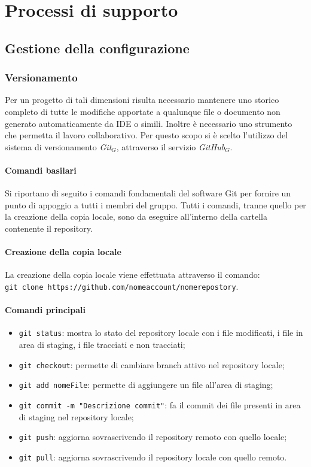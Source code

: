 \chapter{Processi di supporto}\label{PdS}
\section{Gestione della configurazione}
\subsection{Versionamento}
Per un progetto di tali dimensioni risulta necessario mantenere uno storico completo di tutte le modifiche apportate a qualunque file o documento non generato automaticamente da IDE o simili. Inoltre è necessario uno strumento che permetta il lavoro collaborativo. Per questo scopo si è scelto l'utilizzo del sistema di versionamento \textit{Git$_{G}$}, attraverso il servizio \textit{GitHub$_{G}$}.
\subsubsection{Comandi basilari}
Si riportano di seguito i comandi fondamentali del software Git per fornire un punto di appoggio a tutti i membri del gruppo. Tutti i comandi, tranne quello per la creazione della copia locale, sono da eseguire all'interno della cartella contenente il repository.
\subsubsection{Creazione della copia locale}
La creazione della copia locale viene effettuata attraverso il comando:\\
\texttt{git clone https://github.com/nomeaccount/nomerepostory}.
\subsubsection{Comandi principali}
\begin{itemize}
	\item \texttt{git status}: mostra lo stato del repository locale con i file modificati, i file in area di staging, i file tracciati e non tracciati;
	\item \texttt{git checkout}: permette di cambiare branch attivo nel repository locale;
	\item \texttt{git add nomeFile}: permette di aggiungere un file all'area di staging;
	\item \texttt{git commit -m "Descrizione commit"}: fa il commit dei file presenti in area di staging nel repository locale;
	\item \texttt{git push}: aggiorna sovrascrivendo il repository remoto con quello locale;
	\item \texttt{git pull}: aggiorna sovrascrivendo il repository locale con quello remoto.
\end{itemize}
